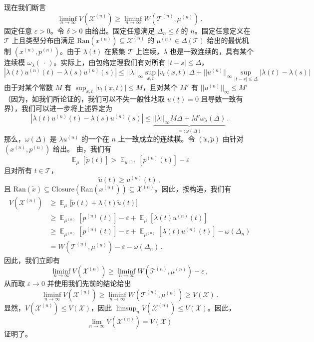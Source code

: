 \documentclass[12pt,letterpaper]{article}
\newenvironment{translation}{\color{blue}\noindent}{}
\theoremstyle{plain}
\theoremstyle{definition}
\theoremstyle{remark}
\DeclareMathOperator{\E}{\mathds{E}}
\renewcommand{\1}{\mathds{1}}
\newcommand{\X}{\mathcal{X}}
\theoremstyle{definition}
\begin{document}
\begin{translation}
现在我们断言
\[\liminf_{n\rightarrow \infty} V(\X^{(n)}) \geq \liminf_{n\rightarrow \infty}W(\mathcal{T}^{(n)}, \mu^{(n)})\,.\]
固定任意 $\varepsilon > 0$。令 $\delta > 0$ 由给出。固定任意满足 $\Delta_n \leq \delta$ 的 $n$。固定任意定义在 $\mathcal{T}$ 上且类型分布由满足 $\text{Ran}(x^{(n)}) \subseteq \X^{(n)}$ 的 $\mu^{(n)} \in \Delta(\mathcal{T})$ 给出的最优机制 $(x^{(n)}, p^{(n)})$。由于 $\lambda(t)$ 在紧集 $\mathcal{T}$ 上连续，$\lambda$ 也是一致连续的，具有某个连续模 $\omega_\lambda(\,\cdot\,)$。实际上，由包络定理我们有对所有 $|t - s| \leq \Delta$，
\[|\lambda(t) u^{(n)}(t) - \lambda(s) u^{(n)}(s)| \leq ||\lambda||_{\infty} \sup_{x, t}|v_t(x, t)|\Delta +  ||u^{(n)}||_\infty\sup_{|t - s| \leq \Delta }|\lambda(t) - \lambda(s)| \]
由于对某个常数 $M$ 有 $\sup_{x, t}|v_t(x, t)| \leq M$，且对某个 $M'$ 有 $||u^{(n)}||_\infty \leq M'$（因为，如我们所论证的，我们可以不失一般性地取 $u(\underline{t}) = 0$ 且导数一致有界），我们可以进一步将上述界定为
\[|\lambda(t) u^{(n)}(t) - \lambda(s) u^{(n)}(s)| \leq \underbrace{||\lambda||_{\infty} M \Delta +  M' \omega_\lambda(\Delta)}_{=:\omega(\Delta)}\,.\]
那么，$\omega(\Delta)$ 是 $\lambda u^{(n)}$ 的一个在 $n$ 上一致成立的连续模。令 $(\tilde{x}, \tilde{p})$ 由针对 $(x^{(n)}, p^{(n)})$ 给出。
由，我们有
\[\E_{\mu}[\tilde{p}(t)] > \E_{\mu^{(n)}}[p^{(n)}(t)] - \varepsilon\]
且对所有 $t \in \mathcal{T}$，
\[\tilde{u}(t) \geq u^{(n)}(t)\,,\]
且 $\text{Ran}(\tilde{x}) \subseteq \text{Closure}(\text{Ran}(x^{(n)})) \subseteq \X^{(n)}$。因此，按构造，我们有
\begin{align*}
    V(\X^{(n)}) &\geq \E_{\mu}\big[\tilde{p}(t) + \lambda(t) \tilde{u}(t)\big]\\
    &\geq  \E_{\mu^{(n)}}[p^{(n)}(t)] - \varepsilon + \E_{\mu}[\lambda(t) u^{(n)}(t)]\\
      &\geq  \E_{\mu^{(n)}}[p^{(n)}(t)] - \varepsilon + \E_{\mu^{(n)}}[\lambda(t) u^{(n)}(t)] - \omega(\Delta_n)\\
        &=  W(\mathcal{T}^{(n)}, \mu^{(n)})- \varepsilon - \omega(\Delta_n)\,.
\end{align*}
因此，我们立即有
\[ \liminf_{n\rightarrow \infty} V(\X^{(n)}) \geq \liminf_{n\rightarrow \infty}W(\mathcal{T}^{(n)}, \mu^{(n)})- \varepsilon\,,\]
从而取 $\varepsilon \rightarrow 0$ 并使用我们先前的结论给出
\[\liminf_{n\rightarrow \infty} V(\X^{(n)}) \geq \liminf_{n\rightarrow \infty}W(\mathcal{T}^{(n)}, \mu^{(n)}) \geq V(\X)\,.\]
显然，$V(\X^{(n)}) \leq V(\X)$，因此 $\limsup_{n} V(\X^{(n)}) \leq V(\X)$。因此，
\[\lim_{n \rightarrow \infty} V(\X^{(n)}) = V(\X)\]
证明了。
\end{translation}
\end{document}

